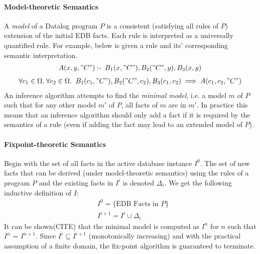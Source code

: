 \paragraph{Model-theoretic Semantics}\NL
A \textit{model} of a Datalog program $P$ is a consistent (satisfying all rules of $P$) extension of the initial EDB facts. Each rule is interpreted as a universally quantified rule. For example, below is given a rule and its' corresponding semantic interpretation. 
\begin{align*}
A(x, y, "C") \mathbin{:\hspace{-0.5ex}\textsf{-}} \;B_1(x, "C"), B_2("C", y), B_3(x, y)
\end{align*}
\begin{align*}
\forall c_1 \in \Omega.\;\forall c_2 \in \Omega. \;\; 
	B_1(c_1, "C"), B_2("C", c_2), B_3(c_1,c_2) \implies  A(c_1, c_2, "C")
\end{align*}
An inference algorithm attempts to find the \textit{minimal model}, i.e. a model $m$ of $P$ such that for any other model $m'$ of $P$, all facts of $m$ are in $m'$. In practice this means that an inference algorithm should only add a fact if it is required by the semantics of a rule (even if adding the fact may lead to an extended model of $P$). 

\paragraph{Fixpoint-theoretic Semantics}\NL
Begin with the set of all facts in the active database instance $I^0$. The set of new facts that can be derived (under model-theoretic semantics) using the rules of a program $P$ and the existing facts in $I^i$ is denoted $\Delta_i$. We get the following inductive definition of $I$:
\begin{align*}
&I^0 = \{ \text{EDB Facts in } P \}\\
&I^{i + 1} = I^i \cup \Delta_i 
\end{align*}
It can be shown(CITE) that the minimal model is computed as $I^{n}$ for $n$ such that $I^{n}$ = $I^{n + 1}$. Since $I^i \subseteq I^{i + 1}$ (monotonically increasing) and with the practical assumption of a finite domain, the fix-point algorithm is guaranteed to terminate.

